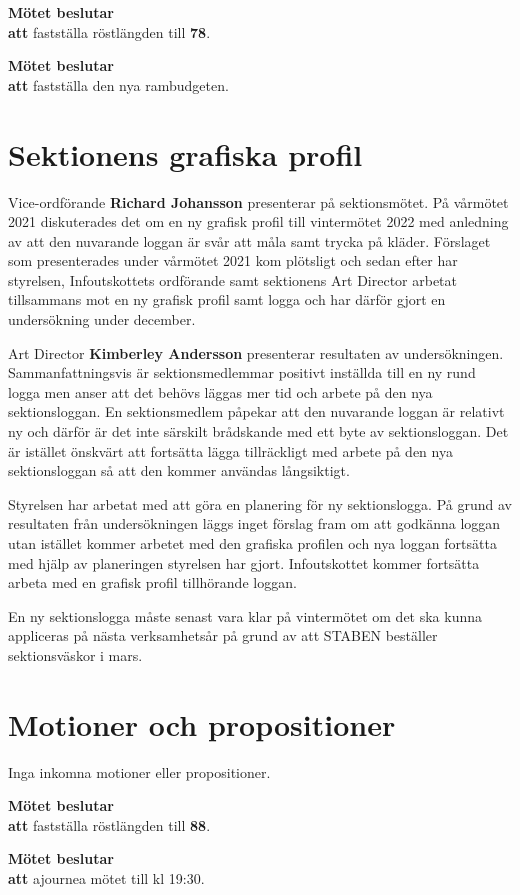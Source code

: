 \documentclass{datateknologsektionen-document}
\newcommand{\ind}{\hspace*{2em}}
\newcommand{\motetbeslutar}{\textbf{Mötet beslutar}}
\newcommand{\att}{\\\ind\textbf{att}}
\begin{document}
\motetbeslutar
\att{} fastställa röstlängden till \textbf{78}.

\motetbeslutar
\att{} fastställa den nya rambudgeten.

\section{Sektionens grafiska profil}
Vice-ordförande \textbf{Richard Johansson} presenterar på sektionsmötet.
På vårmötet 2021 diskuterades det om en ny grafisk profil till vintermötet 2022 med anledning av att den nuvarande loggan är svår att måla samt trycka på kläder.
Förslaget som presenterades under vårmötet 2021 kom plötsligt och sedan efter har styrelsen, Infoutskottets ordförande samt sektionens Art Director arbetat tillsammans mot en ny grafisk profil samt logga och har därför gjort en undersökning under december.

Art Director \textbf{Kimberley Andersson} presenterar resultaten av undersökningen.
Sammanfattningsvis är sektionsmedlemmar positivt inställda till en ny rund logga men anser att det behövs läggas mer tid och arbete på den nya sektionsloggan. En sektionsmedlem påpekar att den nuvarande loggan är relativt ny och därför är det inte särskilt brådskande med ett byte av sektionsloggan. Det är istället önskvärt att fortsätta lägga tillräckligt med arbete på den nya sektionsloggan så att den kommer användas långsiktigt.

Styrelsen har arbetat med att göra en planering för ny sektionslogga. På grund av resultaten från undersökningen läggs inget förslag fram om att godkänna loggan utan istället kommer arbetet med den grafiska profilen och nya loggan fortsätta med hjälp av planeringen styrelsen har gjort. Infoutskottet kommer fortsätta arbeta med en grafisk profil tillhörande loggan. 

En ny sektionslogga måste senast vara klar på vintermötet om det ska kunna appliceras på nästa verksamhetsår på grund av att STABEN beställer sektionsväskor i mars.


\section{Motioner och propositioner}
Inga inkomna motioner eller propositioner. 

\motetbeslutar\att{} fastställa röstlängden till \textbf{88}.

\motetbeslutar\att{} ajournea mötet till kl 19:30.
\end{document}
